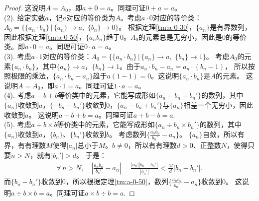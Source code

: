 \documentclass[12pt,UTF8,fontset=none]{ctexbook}
\begin{document}
\begin{appendix}
\begin{proof}
    这说明$A = A_0$，即$a + 0 = a$。同理可证$0+a=a$。\\
    (2). 给定实数$a$，记$a$对应的等价类为$A$。考虑$a\cdot 0$对应的等价类：$A_0 = \{ \{a_n \cdot b_n\} \,|\, \{a_n\}\to a, \,\, \{b_n\} \to 0 \}$。
    根据定理\ref{tm:a-0-30}，$\{a_n\}$是有界数列，因此根据定理\ref{tm:a-0-50}，$\{a_nb_n\}$趋于$0$。$A_0$的元素总是无穷小，因此是$0$的等价类。即$a \cdot 0 = a$。同理可证$0\cdot a=a$。\\
    (3). 考虑$a\cdot 1$对应的等价类：$A_0 = \{\{a_n \cdot b_n\} \,|\, \{a_n\}\to a, \,\, \{b_n\} \to 1 \}$。
    考虑$A_0$的元素$\{a_n \cdot b_n\}$，其中$\{a_n\}\to a$，$\{b_n\} \to 1$。由于$a_n \cdot b_n - a_n = a_n \cdot (b_n - 1)$，
    所以按照极限的乘法，$\{a_n \cdot b_n - a_n\}$趋于$a(1 - 1) = 0$。这说明$\{a_n \cdot b_n\}$是$A$的元素。
    这说明$A = A_0$，即$a \cdot 1 = a$。同理可证$1 \cdot a = a$。\\
    (4). 考虑$a - b + b$等价类中的元素，它能写成形如$\{a_n - b_n + b_n'\}$的数列，其中$\{a_n\}$收敛到$a$，$\{- b_n + b_n'\}$收敛到$0$，$\{a_n - b_n + b_n'\}$与$\{a_n\}$相差一个无穷小，因此收敛到$a$。
    这说明$a - b + b = a$。同理可证$a + b - b = a.$\\
    (5). 考虑$a \div b \times b$等价类中的元素，它能写成形如$\{a_n \div b_n \times b_n'\}$的数列，其中$\{a_n\}$收敛到$a$，$\{b_n\}$、$\{b_n'\}$收敛到$b$。
    考虑数列$\{\frac{a_n b_n}{b_n'} - a_n\}$。
    $\{a_n\}$自敛，所以有界，有有理数$M$使得$|a_n|$总小于$M$。$b\neq 0$，所以有有理数$d>0$、正整数$N$，使得只要$n>N$，就有$|b_n'| > d$。
    于是：
    \begin{align*}
       \forall\,n>N,\quad \left|\frac{a_n b_n}{b_n'} - a_n\right| = \frac{\left|a_n\right| \left|b_n - b_n'\right|}{\left|b_n'\right|}  < \frac{M}{d}\left|b_n - b_n'\right|. 
    \end{align*}
    而$\{b_n - b_n'\}$收敛到$0$，所以根据定理\ref{tm:a-0-50}，数列$\{\frac{a_n b_n}{b_n'} - a_n\}$收敛到$0$。
    这说明$a \div b \times b = a$。同理可证$a\times b \div b = a.$
\end{proof}


\end{appendix}
\end{document}

